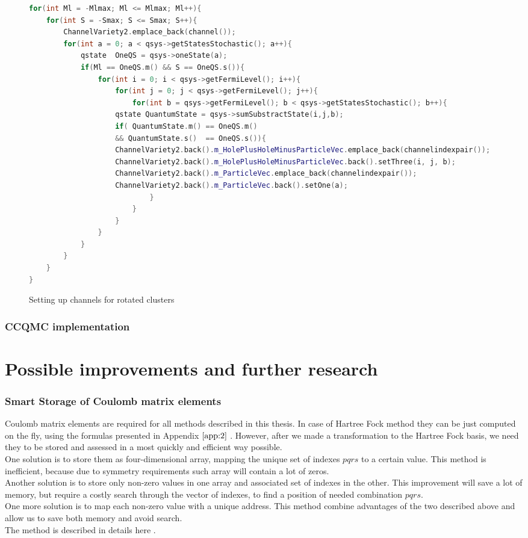 \documentclass[twoside,english]{uiofysmaster}
\theoremstyle{definition}
\begin{document}
\begin{figure}
	\begin{lstlisting}[language=C++]
for(int Ml = -Mlmax; Ml <= Mlmax; Ml++){
   	for(int S = -Smax; S <= Smax; S++){
   		ChannelVariety2.emplace_back(channel());
   		for(int a = 0; a < qsys->getStatesStochastic(); a++){
   			qstate  OneQS = qsys->oneState(a);
   			if(Ml == OneQS.m() && S == OneQS.s()){
   				for(int i = 0; i < qsys->getFermiLevel(); i++){
   					for(int j = 0; j < qsys->getFermiLevel(); j++){
  						for(int b = qsys->getFermiLevel(); b < qsys->getStatesStochastic(); b++){
					qstate QuantumState = qsys->sumSubstractState(i,j,b);
					if( QuantumState.m() == OneQS.m()
					&& QuantumState.s()  == OneQS.s()){
					ChannelVariety2.back().m_HolePlusHoleMinusParticleVec.emplace_back(channelindexpair());
					ChannelVariety2.back().m_HolePlusHoleMinusParticleVec.back().setThree(i, j, b);
					ChannelVariety2.back().m_ParticleVec.emplace_back(channelindexpair());
					ChannelVariety2.back().m_ParticleVec.back().setOne(a);
  							}
   						}
   					}
   				}
   			}
   		}
   	}
}
\end{lstlisting}
\caption{Setting up channels for rotated clusters} \label{f:vectors_for_Q4}
\end{figure}

\section{CCQMC implementation}

\part{Possible improvements and further research}

\section{Smart Storage of Coulomb matrix elements}
Coulomb matrix elements are required for all methods described in this thesis. In case of Hartree Fock method they can be just computed on the fly, using the formulas presented in Appendix $\ref{app:2}$ . However, after we made a transformation to the Hartree Fock basis, we need they to be stored and assessed in a most quickly and efficient way possible. \\
One solution is to store them as four-dimensional array, mapping the unique set of indexes $pqrs$ to a certain value. This method is inefficient, because due to symmetry requirements such array will contain a lot of zeros.\\
Another solution is to store only non-zero values in one array and associated set of indexes  in the other. This improvement will save a lot of memory, but require a costly search through the vector of indexes, to find a position of needed combination $pqrs$.\\
One more solution is to map each non-zero value with a unique address. This method combine advantages of the two described above and allow us to save both memory and avoid search.\\
The method is described in details here \cite{leikangerFullConfigurationInteraction}.
\end{document}
